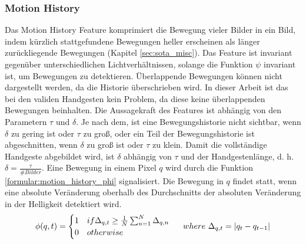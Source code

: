 \subsubsection{Motion History}
Das Motion History Feature komprimiert die Bewegung vieler Bilder in ein Bild, indem kürzlich stattgefundene Bewegungen heller erscheinen als länger zurückliegende Bewegungen (Kapitel \ref{sec:sota_misc}). Das
Feature ist invariant gegenüber unterschiedlichen Lichtverhältnissen, solange die Funktion $\psi$ invariant ist, um Bewegungen zu detektieren. Überlappende Bewegungen können nicht dargestellt werden, da die
Historie überschrieben wird. In dieser Arbeit ist das bei den validen Handgesten kein Problem, da diese keine überlappenden Bewegungen beinhalten.
\newline
\newline
Die Aussagekraft des Features ist abhängig von den Parametern $\tau$ und $\delta$. Je nach dem, ist eine Bewegungshistorie nicht sichtbar, wenn $\delta$ zu gering ist oder $\tau$ zu groß, oder ein Teil der
Bewegungshistorie ist abgeschnitten, wenn $\delta$ zu groß ist oder $\tau$ zu klein. Damit die vollständige Handgeste abgebildet wird, ist $\delta$ abhängig von $\tau$ und der Handgestenlänge, d. h.
$\delta = \frac{\tau}{\#Bilder}$.
\newline
\newline
Eine Bewegung in einem Pixel $q$ wird durch die Funktion \ref{formular:motion_history_phi} signalisiert. Die Bewegung in $q$ findet statt, wenn eine absolute Veränderung oberhalb des Durchschnitts der
absoluten Veränderung in der Helligkeit detektiert wird.
\begin{align}
    \phi(q,t) = \begin{cases}
                    1 & if \Delta_{q,t} \geq \frac{1}{N} \sum_{n=1}^N \Delta_{q,n} \\
                    0 & otherwise
    \end{cases}
    \hspace{0.5cm}where\ \Delta_{q,t} = |q_t - q_{t-1}|
    \label{formular:motion_history_phi}
\end{align}

